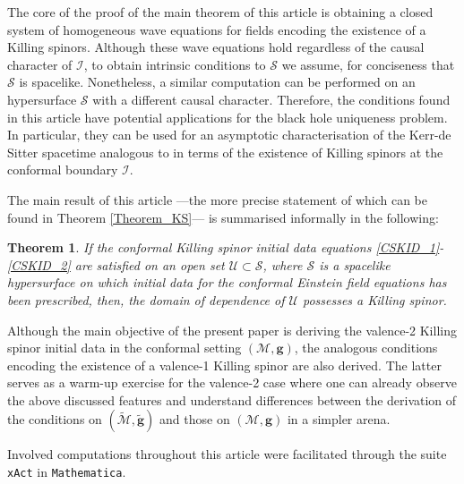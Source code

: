 \documentclass[10pt,a4paper]{article}
\theoremstyle{plain}
\newtheorem*{main}{Theorem}
\def\bmg{{\bm g}}
\begin{document}
\medskip
   The core of the proof of the main theorem of this article is
   obtaining a closed system of homogeneous wave equations for fields
   encoding the existence of a Killing spinors. Although these wave
   equations hold regardless of the causal character of $\mathscr{I}$,
   to obtain intrinsic conditions to $\mathcal{S}$ we assume, for conciseness
   that $\mathcal{S}$ is spacelike.  Nonetheless, a similar
   computation can be performed on an hypersurface $\mathcal{S}$ with
   a different causal character. Therefore, the conditions found in this article
   have potential applications for the black hole uniqueness problem.
   In particular, they can be used for an asymptotic characterisation
   of the Kerr-de Sitter spacetime analogous to \cite{MarPaeSenSim16}
   in terms of the existence of Killing spinors at the conformal
   boundary $\mathscr{I}$.

\medskip

The main result of this article ---the more precise statement of which
can be found in Theorem \ref{Theorem_KS}--- is summarised informally
in the following:

\begin{main}\label{TheoremSummary}
If the conformal Killing spinor initial data equations
 \eqref{CSKID_1}-\eqref{CSKID_2}  are satisfied
on an open set $\mathcal{U}\subset \mathcal{S}$, where
 $\mathcal{S}$ is a spacelike hypersurface on which initial data for 
the conformal Einstein field equations has been prescribed,
 then, the domain of dependence of $\mathcal{U}$  possesses a Killing spinor.
\end{main}

    Although the main objective of the present paper is deriving the
    valence-2 Killing spinor initial data in the conformal setting
    $(\mathcal{M},\bmg)$, the analogous conditions encoding the
    existence of a valence-1 Killing spinor are also derived.  The
    latter serves as a warm-up exercise for the valence-2 case where
    one can already observe the above discussed features and
    understand differences between the derivation of the conditions on
    $(\tilde{\mathcal{M}},\tilde{\bmg})$ and those on
    $(\mathcal{M},\bmg)$ in a simpler arena.

\medskip


Involved computations throughout this article were facilitated through
the suite {\tt xAct} in {\tt Mathematica}.
\end{document}

